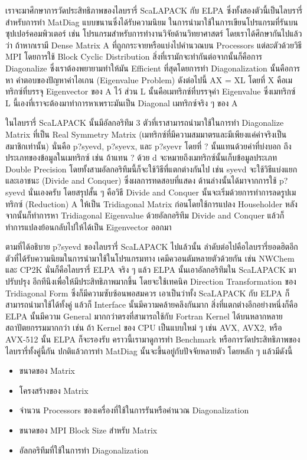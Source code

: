 เราจะมาศึกษาการวัดประสิทธิภาพของไลบรารี่ ScaLAPACK กับ ELPA ซึ่งทั้งสองตัวนี้เป็นไลบรารี่สำหรับการทำ MatDiag แบบขนานซึ่งได้รับความนิยม%
ในการนำมาใช้ในการเขียนโปรแกรมที่รันบนซุปเปอร์คอมพิวเตอร์ เช่น โปรแกรมสำหรับการทำงานวิจัยด้านวิทยาศาสตร์ โดยเราได้ศึกษากันไปแล้วว่า%
ถ้าหากเรามี Dense Matrix A ที่ถูกกระจายหรือแบ่งไปคำนวณบน Processors แต่ละตัวด้วยวิธี MPI โดยการใช้ Block Cyclic Distribution
สิ่งที่เรามักจะทำกันต่อจากนั้นก็คือการ Diagonalize ซึ่งเราต้องพยายามทำให้มัน Efficient ที่สุดโดยการทำ Diagonalization นั้นคือการหา%
คำตอบของปัญหาค่าไอเกน (Eigenvalue Problem) ดังต่อไปนี้ AX = XL โดยที่ X คือเมทริกซ์ที่บรรจุ Eigenvector ของ A ไว้ ส่วน L
นั้นคือเมทริกซ์ที่บรรจุค่า Eigenvalue ซึ่งเมทริกซ์ L นี้เองที่เราจะต้องมาทำการหาเพราะมันเป็น Diagonal เมทริกซ์จริง ๆ ของ A

ในไลบรารี่ ScaLAPACK นั้นมีอัลกอริทึม 3 ตัวที่เราสามารถนำมาใช้ในการทำ Diagonalize Matrix ที่เป็น Real Symmetry Matrix
(เมทริกซ์ที่มีความสมมาตรและมีเพียงแค่ค่าจริงเป็นสมาชิกเท่านั้น) นั่นคือ p?syevd, p?syevx, และ p?syevr โดยที่ ? นั้นแทนด้วยค่าที่บ่งบอก%
ถึงประเภทของข้อมูลในเมทริกซ์ เช่น ถ้าแทน ? ด้วย d จะหมายถึงเมทริกซ์นั้นเก็บข้อมูลประเภท Double Precision
โดยทั้งสามอัลกอริทึมนี้ก็จะใช้วิธีที่แตกต่างกันไป เช่น syevd จะใช้วิธีแบ่งแยกและเอาชนะ (Divide and Conquer) ซึ่งผลการทดสอบที่แสดง%
ด้านล่างนั้นได้มาจากการใช้ p?syevd นั่นเองครับ โดยสรุปสั้น ๆ คือวิธี Divide and Conquer นั้นจะเริ่มด้วยการทำการลดรูปเมทริกซ์ (Reduction)
A ให้เป็น Tridiagonal Matrix ก่อนโดยใช้การแปลง Householder หลังจากนั้นก็ทำการหา Tridiagonal Eigenvalue ด้วยอัลกอริทึม
Divide and Conquer แล้วก็ทำการแปลงย้อนกลับไปให้ได้เป็น Eigenvector ออกมา

ตามที่ได้อธิบาย p?syevd ของไลบรารี่ ScaLAPACK ไปแล้วนั้น ลำดับต่อไปคือไลบรารี่ยอดฮิตอีกตัวที่ได้รับความนิยมในการนำมาใช้ในโปรแกรมทาง%
เคมีควอนตัมหลายตัวด้วยกัน เช่น NWChem และ CP2K นั่นก็คือไลบรารี่ ELPA จริง ๆ แล้ว ELPA นั้นเอาอัลกอริทึมใน ScaLAPACK มาปรับปรุง%
อีกทีนึงเพื่อให้มีประสิทธิภาพมากขึ้น โดยจะใช้เทคนิค Direction Transformation ของ Tridiagonal Form ซึ่งก็มีความซับซ้อนพอสมควร
เอาเป็นว่าทั้ง ScaLAPACK กับ ELPA ก็สามารถนำมาใช้ได้ทั้งคู่ แล้วก็ Interface นั้นมีความคล้ายคลึงกันมาก สิ่งที่แตกต่างอีกอย่างหนึ่งก็คือ ELPA
นั้นมีความ General มากกว่าตรงที่สามารถใช้กับ Fortran Kernel ได้บนหลากหลายสถาปัตยกรรมมากกว่า เช่น ถ้า Kernel ของ CPU เป็นแบบใหม่ ๆ
เช่น AVX, AVX2, หรือ AVX-512 นั้น ELPA ก็จะรองรับ คราวนี้เรามาดูการทำ Benchmark หรือการวัดประสิทธิภาพของไลบรารี่ทั้งคู่นี้กัน
ปกติแล้วการทำ MatDiag นั้นจะขึ้นอยู่กับปัจจัยหลายตัว โดยหลัก ๆ แล้วมีดังนี้

\begin{itemize}[topsep=0pt,noitemsep]
  \setlength\itemsep{0.5em}
  \item ขนาดของ Matrix

  \item โครงสร้างของ Matrix

  \item จำนวน Processors ของเครื่องที่ใช้ในการรันหรือคำนวณ Diagonalization

  \item ขนาดของ MPI Block Size สำหรับ Matrix

  \item อัลกอริทึมที่ใช้ในการทำ Diagonalization
\end{itemize}

